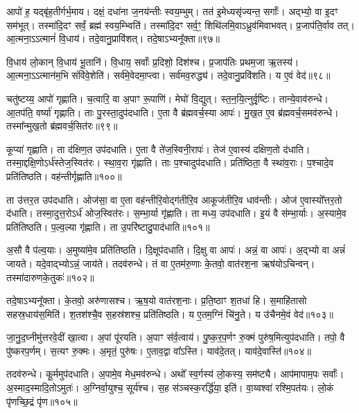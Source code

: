 आपो॑ ह॒ यद्बृ॑ह॒तीर्गर्भ॒माय\snn{}। दक्षं॒ दधा॑ना ज॒नय॑न्तीः स्वय॒म्भुम्। 
तत॑ इ॒मेध्यसृ॑ज्यन्त॒ सर्गाः᳚। अद्भ्यो॒ वा इ॒दꣳ सम॑भूत्। 
तस्मा॑दि॒दꣳ सर्वं॒ ब्रह्म॑ स्वय॒म्भ्विति॑। 
तस्मा॑दि॒दꣳ सर्व॒ꣳ॒ शिथि॑लमि॒वाऽध्रुव॑मिवाभवत्। 
प्र॒जाप॑ति॒र्वाव तत्। आ॒त्मना॒ऽऽत्मानं॑ वि॒धाय॑। 
तदे॒वानु॒प्रावि॑शत्। तदे॒षाऽभ्यनू᳚क्ता॥९७॥


वि॒धाय॑ लो॒कान्‌ वि॒धाय॑ भू॒तानि॑। वि॒धाय॒ सर्वाः᳚ प्र॒दिशो॒ दिश॑श्च। 
प्र॒जाप॑तिः प्रथम॒जा ऋ॒तस्य॑। आ॒त्मना॒ऽऽत्मान॑म॒भि संवि॑वे॒शेति॑। 
सर्व॑मे॒वेदमा॒प्त्वा। सर्व॑मव॒रुद्ध्य॑। 
तदे॒वानु॒प्रवि॑शति। य ए॒वं वेद॑॥९८॥\anuvakamend


चतु॑ष्टय्य॒ आपो॑ गृह्णाति। च॒त्वारि॒ वा अ॒पाꣳ रू॒पाणि॑। 
मेघो॑ वि॒द्युत्। स्त॒न॒यि॒त्नुर्वृ॒ष्टिः। तान्ये॒वाव॑रुन्धे। 
आ॒तप॑ति॒ वर्ष्या॑ गृह्णाति। ताः पु॒रस्ता॒दुप॑दधाति। 
ए॒ता वै ब्र॑ह्मवर्च॒स्या आपः॑। मु॒ख॒त ए॒व ब्र॑ह्मवर्च॒समव॑रुन्धे। 
तस्मा᳚न्मुख॒तो ब्र॑ह्मवर्च॒सित॑रः॥९९॥


कूप्या॑ गृह्णाति। ता द॑क्षिण॒त उप॑दधाति। 
ए॒ता वै ते॑ज॒स्विनी॒रापः॑। तेज॑ ए॒वास्य॑ दक्षिण॒तो द॑धाति। 
तस्मा॒द्दक्षि॒णोऽर्ध॑स्तेज॒स्वित॑रः। स्था॒व॒रा गृ॑ह्णाति। 
ताः प॒श्चादुप॑दधाति। प्रति॑ष्ठिता॒ वै स्था॑व॒राः। 
प॒श्चादे॒व प्रति॑तिष्ठति। वह॑न्तीर्गृह्णाति॥१००॥


ता उ॑त्तर॒त उप॑दधाति। ओज॑सा॒ वा ए॒ता वह॑न्तीरि॒वोद्ग॑तीरि॒व आकूज॑तीरि॒व धाव॑न्तीः। 
ओज॑ ए॒वास्यो᳚त्तर॒तो द॑धाति। तस्मा॒दुत्त॒रोऽर्ध॑ ओज॒स्वित॑रः। 
स॒म्भा॒र्या गृ॑ह्णाति। ता मध्य॒ उप॑दधाति। 
इ॒यं वै स॑म्भा॒र्याः। अ॒स्यामे॒व प्रति॑तिष्ठति। 
प॒ल्व॒ल्या गृ॑ह्णाति। ता उ॒परि॑ष्टादु॒पाद॑धाति॥१०१॥


अ॒सौ वै प॑ल्व॒याः। अ॒मुष्या॑मे॒व प्रति॑तिष्ठति। 
दि॒क्षूप॑दधाति। दि॒क्षु वा आपः॑। 
अन्नं॒ वा आपः॑। अ॒द्भ्यो वा अन्नं॑ जायते। 
यदे॒वाद्भ्योऽन्नं॒ जाय॑ते। तदव॑रुन्धे। 
तं वा ए॒तम॑रु॒णाः के॒तवो॒ वात॑रश॒ना ऋष॑योऽचिन्वन्। 
तस्मा॑दारुणके॒तुकः॑॥१०२॥


तदे॒षाऽभ्यनू᳚क्ता। के॒तवो॒ अरु॑णासश्च। 
ऋ॒ष॒यो वात॑रश॒नाः। प्र॒ति॒ष्ठाꣳ श॒तधा॑ हि। 
स॒माहि॑तासो सहस्र॒धाय॑स॒मिति॑। श॒तश॑श्चै॒व स॒हस्र॑शश्च॒ प्रति॑तिष्ठति। 
य ए॒तम॒ग्निं चि॑नु॒ते। य उ॑चैनमे॒वं वेद॑॥१०३॥\anuvakamend


जा॒नु॒द॒घ्नीमु॑त्तरवे॒दीं खा॒त्वा। अ॒पां पू॑रयति। 
अ॒पाꣳ स॑र्व॒त्वाय॑। पु॒ष्क॒र॒प॒र्णꣳ रु॒क्मं पुरु॑ष॒मित्युप॑दधाति। 
तपो॒ वै पु॑ष्करप॒र्णम्। स॒त्यꣳ रु॒क्मः। 
अ॒मृतं॒ पुरु॑षः। ए॒ताव॒द्वा वा᳚ऽस्ति। 
याव॑दे॒तत्। याव॑दे॒वास्ति॑॥१०४॥


तदव॑रुन्धे। कू॒र्ममुप॑दधाति। 
अ॒पामे॒व मेध॒मव॑रुन्धे। अथो᳚ स्व॒र्गस्य॑ लो॒कस्य॒ सम॑ष्ट्यै। 
आप॑मापाम॒पः सर्वाः᳚। अ॒स्माद॒स्मादि॒तोऽमुतः॑। 
अ॒ग्निर्वा॒युश्च॒ सूर्य॑श्च। स॒ह स॑ञ्चस्क॒रर्द्धि॑या॒ इति॑। 
वा॒य्वश्वा॑ रश्मि॒पत॑यः। लो॒कं पृ॑णच्छि॒द्रं पृ॑ण॥१०५॥



